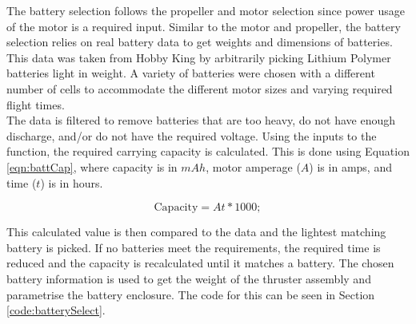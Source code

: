 \documentclass[../main.tex]{subfiles}
\begin{document}
The battery selection follows the propeller and motor selection since power usage of the motor is a required input. Similar to the motor and propeller, the battery selection relies on real battery data to get weights and dimensions of batteries. This data was taken from Hobby King \cite{Hobbyking}  by arbitrarily picking Lithium Polymer batteries light in weight. A variety of batteries were chosen with a different number of cells to accommodate the different motor sizes and varying required flight times.\\

The data is filtered to remove batteries that are too heavy, do not have enough discharge, and/or do not have the required voltage. Using the inputs to the function, the required carrying capacity is calculated. This is done using Equation \ref{eqn:battCap}, where capacity is in $mAh$, motor amperage ($A$) is in amps, and time ($t$) is in hours.

\begin{equation} \label{eqn:battCap}
\text{Capacity} = At*1000;
\end{equation}

This calculated value is then compared to the data and the lightest matching battery is picked. If no batteries meet the requirements, the required time is reduced and the capacity is recalculated until it matches a battery. The chosen battery information is used to get the weight of the thruster assembly and parametrise the battery enclosure. The code for this can be seen in Section \ref{code:batterySelect}.
\end{document}
